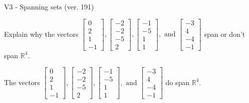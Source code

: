 \begin{exercise}
  \begin{exerciseTitle}V3 - Spanning sets (ver. 191)\end{exerciseTitle}
  \begin{exerciseStatement}
    Explain why the vectors \(\left[\begin{array}{r}
0 \\
2 \\
1 \\
-1
\end{array}\right] , \left[\begin{array}{r}
-2 \\
-2 \\
-5 \\
2
\end{array}\right] , \left[\begin{array}{r}
-1 \\
-5 \\
1 \\
1
\end{array}\right] , \text{ and } \left[\begin{array}{r}
-3 \\
4 \\
-4 \\
-1
\end{array}\right]\) span or don't span \(\mathbb{R}^4\). 
	


  \end{exerciseStatement}
  \begin{exerciseAnswer}
   The vectors \(\left[\begin{array}{r}
0 \\
2 \\
1 \\
-1
\end{array}\right] , \left[\begin{array}{r}
-2 \\
-2 \\
-5 \\
2
\end{array}\right] , \left[\begin{array}{r}
-1 \\
-5 \\
1 \\
1
\end{array}\right] , \text{ and } \left[\begin{array}{r}
-3 \\
4 \\
-4 \\
-1
\end{array}\right]\) 
  	 do  
	span \(\mathbb{R}^4\).
  


  \end{exerciseAnswer}
\end{exercise}